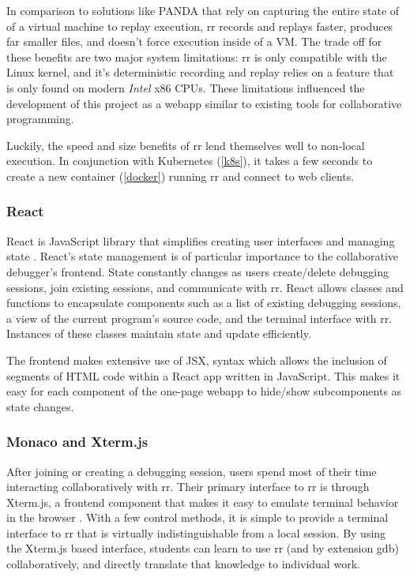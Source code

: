 \documentclass[12pt]{article}
\begin{document}
In comparison to solutions like PANDA\cite{10.1145/2843859.2843867}
that rely on capturing the entire state of of a virtual machine to
replay execution, rr records and replays faster, produces far smaller
files, and doesn't force execution inside of a
VM.\cite{DBLP:journals/corr/OCallahanJFHNP17} The trade off for these
benefits are two major system limitations: rr is only compatible with
the Linux kernel, and it's deterministic recording and replay relies
on a feature that is only found on modern \textit{Intel} x86 CPUs.
These limitations influenced the development of this project as a
webapp similar to existing tools for collaborative programming.
\par

Luckily, the speed and size benefits of rr lend themselves well to
non-local execution.  In conjunction with Kubernetes (\ref{k8s}), it
takes a few seconds to create a new container (\ref{docker}) running
rr and connect to web clients.

\subsubsection{React}\label{react}

React is JavaScript library that simplifies creating user interfaces
and managing state \cite{react}.  React's state management is of
particular importance to the collaborative debugger's frontend.  State
constantly changes as users create/delete debugging sessions, join
existing sessions, and communicate with rr.  React allows classes and
functions to encapsulate components such as a list of existing
debugging sessions, a view of the current program's source code, and
the terminal interface with rr.  Instances of these classes maintain
state and update efficiently.
\par

The frontend makes extensive use of JSX, syntax which allows the
inclusion of segments of HTML code within a React app written in
JavaScript.  This makes it easy for each component of the one-page
webapp to hide/show subcomponents as state changes.

\subsubsection{Monaco and Xterm.js}\label{xtermjs/monaco}

After joining or creating a debugging session, users spend most of
their time interacting collaboratively with rr.  Their primary
interface to rr is through Xterm.js, a frontend component that makes
it easy to emulate terminal behavior in the browser \cite{xtermjs}.
With a few control methods, it is simple to provide a terminal
interface to rr that is virtually indistinguishable from a local
session.  By using the Xterm.js based interface, students can learn to
use rr (and by extension gdb) collaboratively, and directly translate
that knowledge to individual work.
\par
\end{document}
